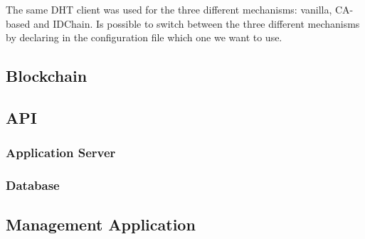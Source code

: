 The same DHT client was used for the three different mechanisms: vanilla, CA-based and IDChain.
Is possible to switch between the three different mechanisms by declaring in the configuration file which one we want to use.

\subsection{Blockchain}


\subsection{API}

\subsubsection{Application Server}

\subsubsection{Database}


\subsection{Management Application}



